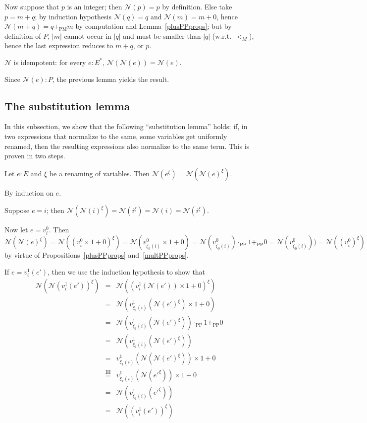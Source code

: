 \documentclass[numreferences]{kluwer}
\newcommand{\N}{\ensuremath{\mathcal{N}}}
\newcommand{\renamevar}[2]{\ensuremath{{#1}^{#2}}}
\newcommand{\plusPM}{\ensuremath{+_{\mathrm{PM}}}}
\newcommand{\plusPP}{\ensuremath{+_{\mathrm{PP}}}}
\newcommand{\multPP}{\ensuremath{\cdot_{\mathrm{PP}}}}
\begin{document}
\begin{article}
\begin{pf}
Now suppose that $p$ is an integer; then $\N(p)=p$ by definition.
Else take $p=m+q$; by induction hypothesis $\N(q)=q$ and $\N(m)=m+0$, hence
$\N(m+q)=q\plusPM m$ by computation and Lemma~\ref{plusPPprops}; but by
definition of $P$, $|m|$ cannot occur in $|q|$ and must be smaller than $|q|$
(w.r.t.\ $<_M$), hence the last expression reduces to $m+q$, or $p$.
\end{pf}

\begin{corollary}\label{NormRidemp} $\N$ is idempotent: for every
$e:E^\ast$, $\N(\N(e))=\N(e)$.
\end{corollary}
\begin{pf}
Since $\N(e):P$, the previous lemma yields the result.
\end{pf}

\subsection{The substitution lemma}

In this subsection, we show that the following ``substitution lemma''
holds: if, in two expressions that normalize to the same, some variables
get uniformly renamed, then the resulting expressions also normalize to
the same term.
This is proven in two steps.
\begin{lemma}\label{substlemmaaux} Let $e:E$ and $\xi$ be a renaming of
variables.  Then $\N(\renamevar e\xi)=\N(\renamevar{\N(e)}\xi)$.
\end{lemma}
\begin{pf}
By induction on $e$.

Suppose $e=i$; then
$\N(\renamevar{\N(i)}\xi)%
=\N(\renamevar i\xi)%
=\N(i)%
=\N(\renamevar i\xi)$.

Now let $e=v^0_i$.  Then
$\N(\renamevar{\N(e)}\xi)%
=\N(\renamevar{(v^0_i\times1+0)}\xi)%
=\N(v^0_{\xi_0(i)}\times1+0)%
=\N(v^0_{\xi_0(i)})\multPP1\plusPP0%
=\N(v^0_{\xi_0(i)}))%
=\N(\renamevar{(v^0_i)}\xi)$
by virtue of Propositions~\ref{plusPPprops} and~\ref{multPPprops}.

If $e=v^1_i(e')$, then we use the induction hypothesis to show that
\begin{eqnarray*}
\N(\renamevar{\N(v^1_i(e'))}\xi)
 & = & \N(\renamevar{(v^1_i(\N(e'))\times1+0)}\xi)\\
 & = & \N(v^1_{\xi_1(i)}(\renamevar{\N(e')}\xi)\times1+0) \\
 & = & \N(v^1_{\xi_1(i)}(\renamevar{\N(e')}\xi))\multPP1\plusPP0 \\
 & = & \N(v^1_{\xi_1(i)}(\renamevar{\N(e')}\xi)) \\
 & = & v^1_{\xi_1(i)}(\N(\renamevar{\N(e')}\xi))\times1+0 \\
 & \stackrel{\mathrm{IH}}= & v^1_{\xi_1(i)}(\N(\renamevar{e'}\xi))\times1+0 \\
 & = & \N(v^1_{\xi_1(i)}(\renamevar{e'}\xi)) \\
 & = & \N(\renamevar{(v^1_i(e'))}\xi)
\end{eqnarray*}


\end{pf}
\end{article}
\end{document}

